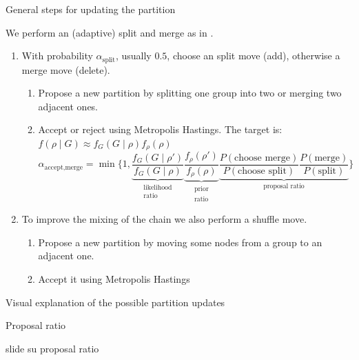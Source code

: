 \begin{frame}{General steps for updating the partition}
    
    We perform an (adaptive) \alert{split and merge} as in \cite{bensonAdaptiveMCMCMultiple2018}.
    \begin{enumerate}
        \item With probability $\alpha_{\text{split}}$, usually $0.5$, choose an \alert{split move (add)}, otherwise a \alert{merge move (delete)}.
        \begin{enumerate}
            \item Propose a new partition by splitting one group into two or merging two adjacent ones.
            \item Accept or reject using Metropolis Hastings. The target is:
            $f(\rho \mid G) \approx f_G(G \mid \rho) f_{\rho}(\rho)$
            \[
                \alpha_{\text{accept,merge}} = \min %
                \bigg\{1,
                \underbrace{\frac{f_G\left(G \mid \rho'\right)}{f_G(G \mid \rho)}}_{\substack{\text{likelihood}\\\text{ratio}}}
                \underbrace{\frac{f_\rho\left(\rho'\right)}{f_\rho(\rho)}}_{\substack{\text{prior}\\\text{ratio}}}
                \underbrace{\frac{P(\text{choose merge})}{P(\text{choose split})} \frac{P(\text{merge})}{P(\text{split})}}_{\text{proposal ratio}}
                \bigg\}
            \]
        \end{enumerate}
        \item To improve the mixing of the chain we also perform a \alert{shuffle move}.
        \begin{enumerate}
            \item Propose a new partition by moving some nodes from a group to an adjacent one.
            \item Accept it using Metropolis Hastings
        \end{enumerate}

    \end{enumerate}

\end{frame}

\begin{frame}{Visual explanation of the possible partition updates}
\end{frame}

\begin{frame}{Proposal ratio}

   slide su proposal ratio

\end{frame}




